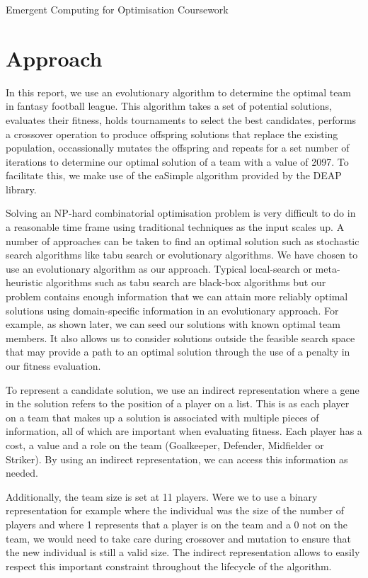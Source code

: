\documentclass[11pt,a4paper]{article}
\begin{document}
\newcommand{\HRule}{\rule{\linewidth}{0.5mm}}

{\Large Emergent Computing for Optimisation Coursework\par}

\section{Approach}
In this report, we use an evolutionary algorithm to determine the optimal team in fantasy football league. This algorithm takes a set of potential solutions, evaluates their fitness, holds tournaments to select the best candidates, performs a crossover operation to produce offspring solutions that replace the existing population, occassionally mutates the offspring and repeats for a set number of iterations to determine our optimal solution of a team with a value of 2097. To facilitate this, we make use of the eaSimple algorithm provided by the DEAP library.

Solving an NP-hard combinatorial optimisation problem is very difficult to do in a reasonable time frame using traditional techniques as the input scales up. A number of approaches can be taken to find an optimal solution such as stochastic search algorithms like tabu search or evolutionary algorithms. We have chosen to use an evolutionary algorithm as our approach. Typical local-search or meta-heuristic algorithms such as tabu search are black-box algorithms but our problem contains enough information that we can attain more reliably optimal solutions using domain-specific information in an evolutionary approach. For example, as shown later, we can seed our solutions with known optimal team members. It also allows us to consider solutions outside the feasible search space that may provide a path to an optimal solution through the use of a penalty in our fitness evaluation.

To represent a candidate solution, we use an indirect representation where a gene in the solution refers to the position of a player on a list. This is as each player on a team that makes up a solution is associated with multiple pieces of information, all of which are important when evaluating fitness.
Each player has a cost, a value and a role on the team (Goalkeeper, Defender, Midfielder or Striker). By using an indirect representation, we can access this information as needed.

Additionally, the team size is set at 11 players. Were we to use a binary representation for example where the individual was the size of the number of players and where 1 represents that a player is on the team and a 0 not on the team, we would need to take care during crossover and mutation to ensure that the new individual is still a valid size. The indirect representation allows to easily respect this important constraint throughout the lifecycle of the algorithm.
\end{document}
